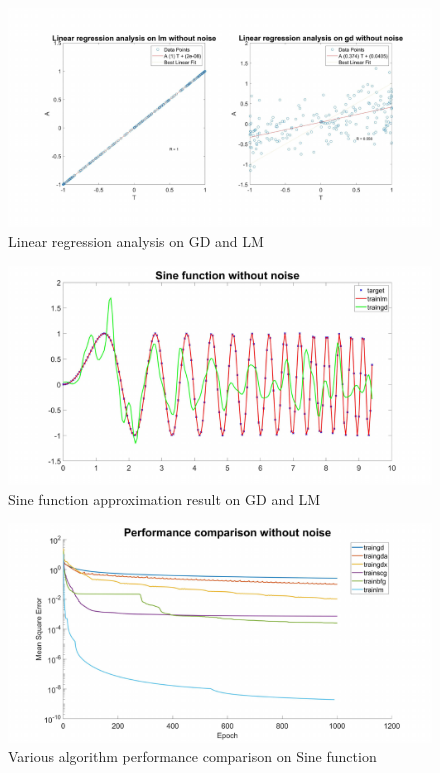\documentclass{article}
\begin{document}
\begin{figure}[h!]
  \centering
  \includegraphics[width=\textwidth]{lab1/lmgdcomparewithoutnoise.pdf}
  \caption{Linear regression analysis on GD and LM}
  \label{linear1}
\end{figure}

\begin{figure}[h!]
  \centering
  \includegraphics[width=.9\textwidth]{lab1/sinenonoise.pdf}
  \caption{Sine function approximation result on GD and LM}
  \label{fig:lmgdapprox}
\end{figure}


\begin{figure}[h!]
  \centering
  \includegraphics[width=.9\textwidth]{lab1/performancenonoise.pdf}
  \caption{Various algorithm performance comparison on Sine function}
  \label{fig:compare1}
\end{figure}
\end{document}
